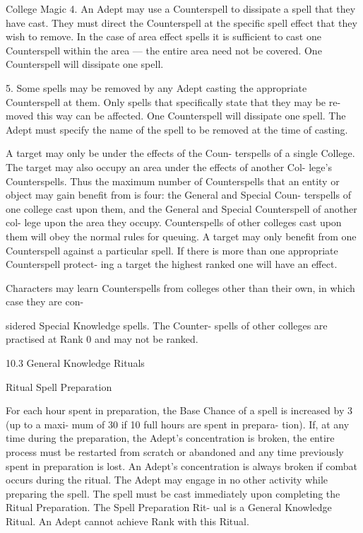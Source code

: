 \begin{Chapter}{College Magic}
4. An Adept may use a Counterspell to dissipate a 
spell  that  they  have  cast.  They  must  direct  the 
Counterspell  at  the  specific  spell  effect  that  they 
wish to remove.  In the case of area  effect spells it 
is  sufficient  to  cast  one  Counterspell  within  the 
area  —  the  entire  area  need  not  be  covered.  One 
Counterspell will dissipate one spell. 

5.  Some  spells  may  be  removed  by  any  Adept 
casting the appropriate Counterspell  at them. Only 
spells  that  specifically  state  that  they  may  be  re-
moved this way can be affected. One Counterspell 
will  dissipate  one  spell.  The  Adept  must  specify 
the name of the spell to  be removed at the time of 
casting. 

A target may only be under the effects of the Coun-
terspells  of  a  single  College.  The  target  may  also 
occupy  an  area  under  the  effects  of  another  Col-
lege’s  Counterspells.  Thus  the  maximum  number 
of  Counterspells  that  an  entity  or  object  may  gain 
benefit from is four: the General and Special Coun-
terspells  of  one  college  cast  upon  them,  and  the 
General  and  Special  Counterspell  of  another  col-
lege  upon  the  area  they  occupy.  Counterspells  of 
other colleges cast upon them will obey the normal 
rules  for  queuing.  A  target  may  only  benefit  from 
one Counterspell against a particular spell. If there 
is more than one appropriate Counterspell protect-
ing  a  target  the  highest  ranked  one  will  have  an 
effect. 

Characters  may  learn  Counterspells  from  colleges 
other  than  their  own,  in  which  case  they  are  con-

sidered  Special  Knowledge  spells.  The  Counter-
spells of other colleges are practised at Rank 0 and 
may not be ranked. 

10.3 General Knowledge Rituals 

Ritual Spell Preparation 

For  each  hour  spent  in  preparation,  the  Base 
Chance of a spell is increased by 3 (up to a maxi-
mum  of  30  if  10  full  hours  are  spent  in  prepara-
tion).  If,  at  any  time  during  the  preparation,  the 
Adept’s concentration is broken, the entire process 
must  be  restarted  from  scratch  or  abandoned  and 
any time previously spent in preparation is lost. An 
Adept’s  concentration  is  always  broken  if  combat 
occurs during the ritual. The Adept may engage in 
no  other  activity  while  preparing  the  spell.  The 
spell  must  be  cast  immediately  upon  completing 
the  Ritual  Preparation.  The  Spell  Preparation  Rit-
ual  is  a  General  Knowledge  Ritual.  An  Adept 
cannot achieve Rank with this Ritual. 


\end{Chapter}
